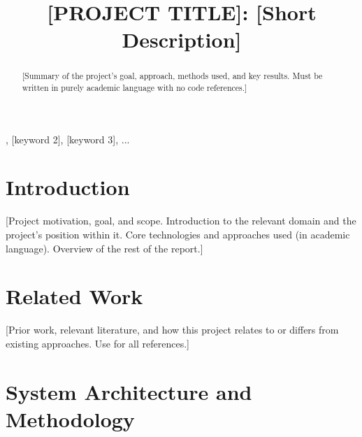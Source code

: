 \documentclass[conference]{IEEEtran}
\begin{document}
\title{[PROJECT TITLE]: [Short Description]}

\author{
}

\maketitle

\begin{abstract}
[Summary of the project's goal, approach, methods used, and key results.
Must be written in purely academic language with no code references.]
\end{abstract}

\begin{IEEEkeywords}
[keyword 1], [keyword 2], [keyword 3], ...
\end{IEEEkeywords}

\section{Introduction}

[Project motivation, goal, and scope.
Introduction to the relevant domain and the project's position within it.
Core technologies and approaches used (in academic language).
Overview of the rest of the report.]

\section{Related Work}

[Prior work, relevant literature, and how this project relates to or differs from existing approaches.
Use \cite{} for all references.]

\section{System Architecture and Methodology}
\end{document}
